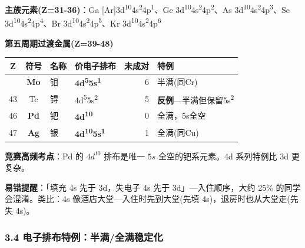 \documentclass[a4paper,11pt]{ctexart}
\newcounter{none}
\newcommand{\箭}{\ensuremath{\rightarrow}}
\newcommand{\左箭}{\ensuremath{\leftarrow}}
\newcommand{\上箭}{\ensuremath{\uparrow}}
\newcommand{\下箭}{\ensuremath{\downarrow}}
\newcommand{\衡}{\ensuremath{\rightleftharpoons}}
\newcommand{\双箭}{\ensuremath{\leftrightarrow}}
\newcommand{\约等于}{\ensuremath{\approx}}
\newcommand{\小于等于}{\ensuremath{\leq}}
\newcommand{\大于等于}{\ensuremath{\geq}}
\newcommand{\不等于}{\ensuremath{\neq}}
\newcommand{\西格马}{\ensuremath{\sigma}}
\newcommand{\派}{\ensuremath{\pi}}
\begin{document}
\textbf{主族元素(Z=31-36)}：Ga {[}Ar{]}3d\textsuperscript{10}4s\textsuperscript{2}4p\textsuperscript{1}、Ge 3d\textsuperscript{10}4s\textsuperscript{2}4p\textsuperscript{2}、As 3d\textsuperscript{10}4s\textsuperscript{2}4p\textsuperscript{3}、Se 3d\textsuperscript{10}4s\textsuperscript{2}4p\textsuperscript{4}、Br 3d\textsuperscript{10}4s\textsuperscript{2}4p\textsuperscript{5}、Kr 3d\textsuperscript{10}4s\textsuperscript{2}4p\textsuperscript{6}

\textbf{第五周期过渡金属(Z=39-48)}

{\def\LTcaptype{none} %
\begin{longtable}[]{@{}ccllrl@{}}
\toprule\noalign{}
Z & 符号 & 名称 & 价电子排布 & 未成对 & 特例 \\
\midrule\noalign{}
\endhead
\bottomrule\noalign{}
\endlastfoot
42 & \textbf{Mo} & 钼 & \textbf{4d\textsuperscript{5}5s\textsuperscript{1}} & 6 & 半满(同Cr) \\
43 & Tc & 锝 & 4d\textsuperscript{5}5s\textsuperscript{2} & 5 & \textbf{反例}---半满但保留5s\textsuperscript{2} \\
46 & \textbf{Pd} & 钯 & \textbf{4d\textsuperscript{10}} & 0 & 全满，5s全空 \\
47 & \textbf{Ag} & 银 & \textbf{4d\textsuperscript{10}5s\textsuperscript{1}} & 1 & 全满(同Cu) \\
\end{longtable}
}

\textbf{竞赛高频考点}：Pd 的 \(4d^{10}\) 排布是唯一 \(5s\) 全空的钯系元素。4d 系列特例比 3d 更复杂。

\textbf{易错提醒}：「填充 4s 先于 3d，失电子 4s 先于 3d」---入住顺序，大约 25\% 的同学会混淆。类比：4s 像酒店大堂---入住时先到大堂(先填 4s)，退房时也从大堂走(先失 4s)。

\subsubsection{3.4 电子排布特例：半满/全满稳定化}\label{ux7535ux5b50ux6392ux5e03ux7279ux4f8bux534aux6ee1ux5168ux6ee1ux7a33ux5b9aux5316}
\end{document}
